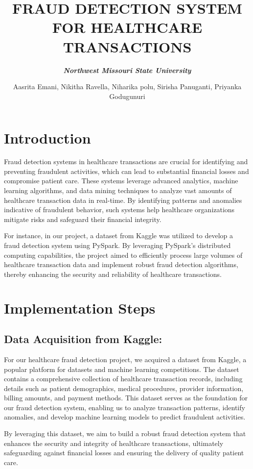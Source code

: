 \documentclass{article}
\title{\textbf{FRAUD DETECTION SYSTEM FOR HEALTHCARE TRANSACTIONS}}
\author{\textbf{\textit{Northwest Missouri State University}}}
\date{Aasrita Emani, Nikitha Ravella, Niharika polu, Sirisha Panuganti, Priyanka Godugunuri}
\begin{document}
\maketitle

\tableofcontents


\newpage\section{\textbf{Introduction}}
\hspace{1cm}Fraud detection systems in healthcare transactions are crucial for identifying and preventing fraudulent activities, which can lead to substantial financial losses and compromise patient care. These systems leverage advanced analytics, machine learning algorithms, and data mining techniques to analyze vast amounts of healthcare transaction data in real-time. By identifying patterns and anomalies indicative of fraudulent behavior, such systems help healthcare organizations mitigate risks and safeguard their financial integrity. 

\hspace{0.5cm}For instance, in our project, a dataset from Kaggle was utilized to develop a fraud detection system using PySpark. By leveraging PySpark's distributed computing capabilities, the project aimed to efficiently process large volumes of healthcare transaction data and implement robust fraud detection algorithms, thereby enhancing the security and reliability of healthcare transactions.
\section{\textbf{Implementation Steps}}
\subsection{Data Acquisition from Kaggle:}
\hspace{1cm}For our healthcare fraud detection project, we acquired a dataset from Kaggle, a popular platform for datasets and machine learning competitions. The dataset contains a comprehensive collection of healthcare transaction records, including details such as patient demographics, medical procedures, provider information, billing amounts, and payment methods. This dataset serves as the foundation for our fraud detection system, enabling us to analyze transaction patterns, identify anomalies, and develop machine learning models to predict fraudulent activities.

\hspace{0.5cm}By leveraging this dataset, we aim to build a robust fraud detection system that enhances the security and integrity of healthcare transactions, ultimately safeguarding against financial losses and ensuring the delivery of quality patient care.
\end{document}
